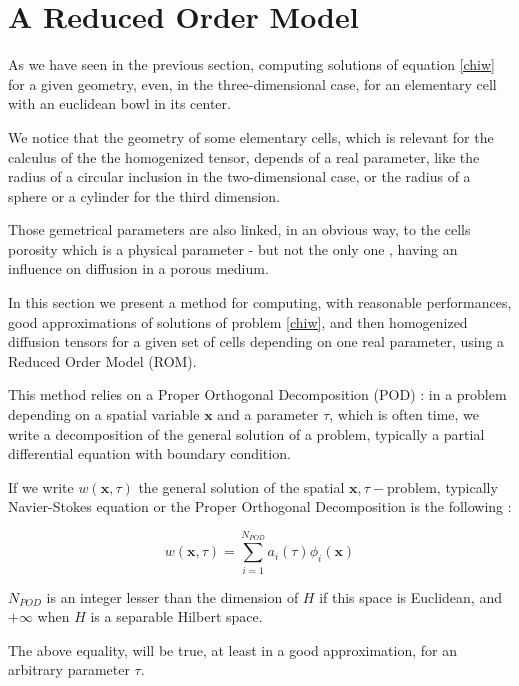 \section{A Reduced Order Model}\label{rom}

As we have seen in the previous section, computing solutions of equation \ref{chiw} for a given geometry, %
even, in the three-dimensional case, for an elementary cell with an euclidean bowl in its center.

\par
We notice that the geometry of some elementary cells, which is relevant for the calculus of the the homogenized tensor, %
depends of a real parameter, like the radius of a circular inclusion in the two-dimensional case, %
or the radius of a sphere or a cylinder for the third dimension.

\par
Those gemetrical parameters are also linked, in an obvious way, to the cells porosity which is a physical parameter - but not the only one , %
having an influence on diffusion in a porous medium.

\par
In this section we present a method for computing, with reasonable performances, good approximations of solutions of problem \ref{chiw}, %
and then homogenized diffusion tensors for a given set of cells depending on one real parameter, using a Reduced Order Model (ROM).

\etoile
This method relies on a Proper Orthogonal Decomposition (POD) : in a problem depending on a spatial variable $\mathbf{x}$ and a parameter $\tau$, %
which is often time, we write a decomposition of the general solution of a problem, typically a partial differential equation with boundary condition.

\par
If we write $w(\mathbf{x},\tau)$ the general solution of the spatial $\mathbf{x},\tau-$problem, typically Navier-Stokes equation or %
the Proper Orthogonal Decomposition is the following :

\begin{equation}\label{POD}
w(\mathbf{x},\tau)=\sum\limits_{i=1}^{N_{POD}} a_i(\tau)\phi_i(\mathbf{x})
\end{equation}

$N_{POD}$ is an integer lesser than the dimension of $H$ if this space is Euclidean, %
and $+\infty$ when $H$ is a separable Hilbert space.

\par
The above equality, will be true, at least in a good approximation, for an arbitrary parameter $\tau$.

